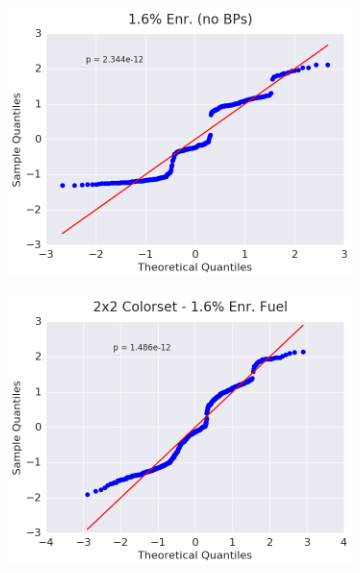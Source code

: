 \begin{figure}[h!]
\centering
\begin{subfigure}{0.5\textwidth}
  \centering
  \includegraphics[width=\linewidth]{figures/patterns/assm-1.6/quantile/assm-16-capt-1}
  \caption{}
  \label{fig:chap9-qq-assm-1.6-capt}
\end{subfigure}%
\begin{subfigure}{0.5\textwidth}
  \centering
  \includegraphics[width=\linewidth]{figures/patterns/2x2/quantile/16-enr-capt-1}
  \caption{}
  \label{fig:chap9-qq-2x2-1.6-capt}
\end{subfigure}
\begin{subfigure}{0.5\textwidth}

\end{subfigure}
\end{figure}
